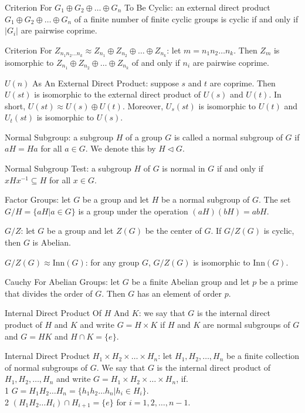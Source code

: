 Criterion For $G_1 \oplus G_2 \oplus \dots \oplus G_n$ To Be Cyclic: an external direct product $G_1 \oplus G_2 \oplus \dots \oplus G_n$ of a finite number of finite cyclic groups is cyclic if and only if $|G_i|$ are pairwise coprime.

Criterion For $Z_{n_1 n_2 \dots n_k} \approx Z_{n_1} \oplus Z_{n_2} \oplus \dots \oplus Z_{n_k}$: let $m = n_1 n_2 \dots n_k$. Then $Z_m$ is isomorphic to $Z_{n_1} \oplus Z_{n_2} \oplus \dots \oplus Z_{n_k}$ of and only if $n_i$ are pairwise coprime.

$U(n)$ As An External Direct Product: suppose $s$ and $t$ are coprime. Then $U(st)$ is isomorphic to the external direct product of $U(s)$ and $U(t)$. In short, $U(st) \approx U(s) \oplus U(t)$. Moreover, $U_s (st)$ is isomorphic to $U(t)$ and $U_t (st)$ is isomorphic to $U(s)$.

Normal Subgroup: a subgroup $H$ of a group $G$ is called a normal subgroup of $G$ if $aH=Ha$ for all $a \in G$. We denote this by $H \lhd G$.

Normal Subgroup Test: a subgroup $H$ of $G$ is normal in $G$ if and only if $xHx^{-1} \subseteq H$ for all $x \in G$.

Factor Groups: let $G$ be a group and let $H$ be a normal subgroup of $G$. The set $G/H = \{aH | a \in G \}$ is a group under the operation $(aH)(bH)=abH$.

$G/Z$: let $G$ be a group and let $Z(G)$ be the center of $G$. If $G/Z(G)$ is cyclic, then $G$ is Abelian.

$G/Z(G) \approx \text{Inn}(G)$: for any group $G$, $G/Z(G)$ is isomorphic to $\text{Inn}(G)$.

Cauchy For Abelian Groups: let $G$ be a finite Abelian group and let $p$ be a prime that divides the order of $G$. Then $G$ has an element of order $p$.

Internal Direct Product Of $H$ And $K$: we say that $G$ is the internal direct product of $H$ and $K$ and write $G = H \times K$ if $H$ and $K$ are normal subgroups of $G$ and $G=HK$ and $H \cap K = \{ e \}$.

Internal Direct Product $H_1 \times H_2 \times \dots \times H_n$: let $H_1,H_2,\dots,H_n$ be a finite collection of normal subgroups of $G$. We say that $G$ is the internal direct product of $H_1,H_2,\dots,H_n$ and write $G=H_1 \times H_2 \times \dots \times H_n$, if. \\
1 $G = H_1 H_2 \dots H_n = \{h_1 h_2 \dots h_n | h_i \in H_i \}$. \\
2 $(H_1 H_2 \dots H_i) \cap H_{i+1} = \{ e \}$ for $i = 1,2,\dots,n-1$.

